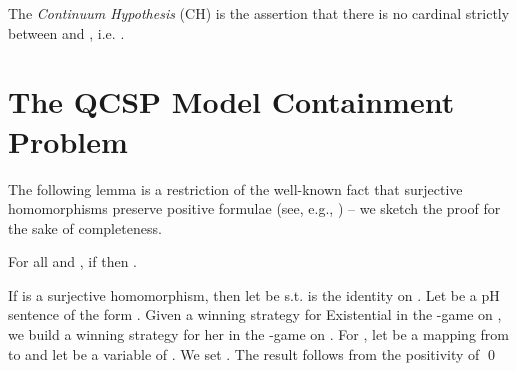 \documentclass{LMCS}
\begin{document}
The \emph{Continuum Hypothesis} (CH) is the assertion that there is no cardinal strictly between  and , i.e. .

\section{The QCSP Model Containment Problem}
\label{sec:RHS}


The following lemma is a restriction of the well-known fact that surjective homomorphisms preserve positive formulae (see, e.g., \cite{Hodges}) -- we sketch the proof for the sake of completeness.
\begin{lem}\label{RHS:lem:pos-pres}
For all  and , if  then .
\end{lem}
\proof[(Sketch)]
If  is a surjective homomorphism, then let  be s.t.  is the identity on . Let  be a pH sentence of the form  . Given a winning strategy  for Existential in the -game on , we build a winning strategy  for her in the -game on . For , let  be a mapping from  to  and let  be a variable of . We set . The result follows from the positivity of 
\qed
\end{document}
